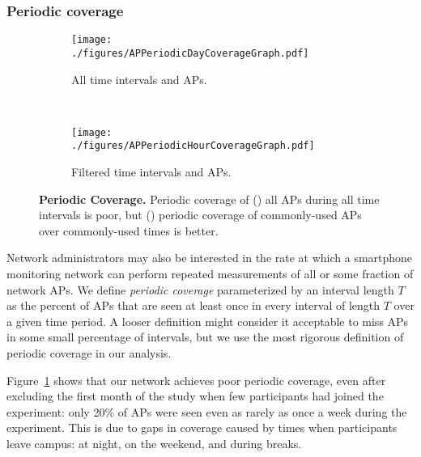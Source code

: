 \subsubsection{Periodic coverage}

\begin{figure}[h!]
  \centering
  \begin{subfigure}[t]{\columnwidth}
  \texttt{[image: ./figures/APPeriodicDayCoverageGraph.pdf]}
  \vspace*{-0.3in}
  \caption{All time intervals and APs.}
  \label{fig:periodic:all}
  \end{subfigure}\\
  \begin{subfigure}[t]{\columnwidth}
  \texttt{[image: ./figures/APPeriodicHourCoverageGraph.pdf]}
  \vspace*{-0.3in}
  \caption{Filtered time intervals and APs.}
  \vspace*{0.05in}
  \label{fig:periodic:filtered}
  \end{subfigure}
  \caption{\textbf{Periodic Coverage.} Periodic coverage of
  () all APs during all time intervals is poor, but
  () periodic coverage of commonly-used APs
  over commonly-used times is better.}
  \vspace*{-0.1in}
\end{figure}

Network administrators may also be interested in the rate at which a
smartphone monitoring network can perform repeated measurements of all or
some fraction of network APs. We define \textit{periodic coverage}
parameterized by an interval length $T$ as the percent of APs that are seen
at least once in every interval of length $T$ over a given time period. A
looser definition might consider it acceptable to miss APs in some small
percentage of intervals, but we use the most rigorous definition of periodic
coverage in our analysis.

Figure~\ref{fig:periodic:all} shows that our network achieves poor periodic
coverage, even after excluding the first month of the study when few
participants had joined the experiment: only 20\% of APs were seen even as
rarely as once a week during the experiment. This is due to gaps in coverage
caused by times when participants leave campus: at night, on the weekend, and
during breaks.

